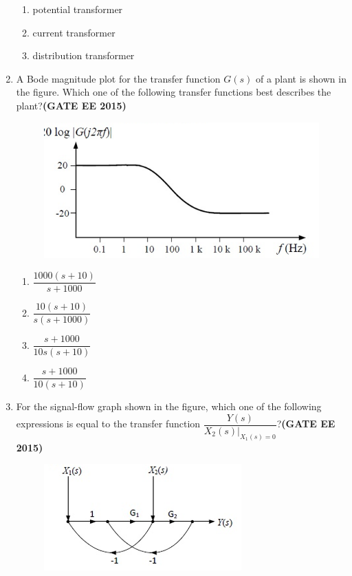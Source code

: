 \documentclass[a4paper,12pt]{exam}
\theoremstyle{remark}
\begin{document}
\begin{enumerate}
\begin{multicols}{2}
\begin{enumerate}
        \item potential transformer
        \item current transformer
        \item distribution transformer
    \end{enumerate}
\end{multicols}
\item A Bode magnitude plot for the transfer function $G(s)$ of a plant is shown in the figure. Which one of the following transfer functions best describes the plant?\hfill{\textbf{(GATE EE 2015)}}
\begin{figure}[H]
    \centering
    \includegraphics[width=0.5\columnwidth]{figs/Q 34.png}
    \caption{}
    \label{fig:placeholder}
\end{figure}
\begin{multicols}{4}
    \begin{enumerate}
        \item $\dfrac{1000(s+10)}{s+1000}$
        \item $\dfrac{10(s+10)}{s(s+1000)}$
        \item $\dfrac{s+1000}{10s(s+10)}$
        \item $\dfrac{s+1000}{10(s+10)}$
    \end{enumerate}
\end{multicols}
\item For the signal-flow graph shown in the figure, which one of the following expressions is equal to the transfer function $\dfrac{Y(s)}{X_2(s)|_{X_1(s)=0}}$?\hfill{\textbf{(GATE EE 2015)}}
\begin{figure}[H]
    \centering
    \includegraphics[width=0.5\columnwidth]{figs/Q 35.png}
    \caption{}
    \label{fig:placeholder}
\end{figure}
\begin{multicols}{4}

\end{multicols}
\end{enumerate}
\end{document}
